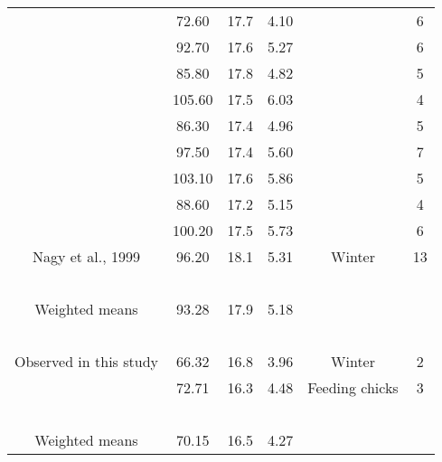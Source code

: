 \documentclass[10pt, twoside]{book} %
\begin{document}
\begin{table}[!ht]
\begin{adjustbox}{max width=\textwidth}
\begin{tabular}{cccccc}
        ~ & 72.60 & 17.7 & 4.10 & ~ & 6 \\ 
        ~ & 92.70 & 17.6 & 5.27 & ~ & 6 \\ 
        ~ & 85.80 & 17.8 & 4.82 & ~ & 5 \\ 
        ~ & 105.60 & 17.5 & 6.03 & ~ & 4 \\ 
        ~ & 86.30 & 17.4 & 4.96 & ~ & 5 \\ 
        ~ & 97.50 & 17.4 & 5.60 & ~ & 7 \\ 
        ~ & 103.10 & 17.6 & 5.86 & ~ & 5 \\ 
        ~ & 88.60 & 17.2 & 5.15 & ~ & 4 \\ 
        ~ & 100.20 & 17.5 & 5.73 & ~ & 6 \\ 
        Nagy et al., 1999 & 96.20 & 18.1 & 5.31 & Winter & 13 \\ 
        ~ & ~ & ~ & ~ & ~ & ~ \\ 
        Weighted means & 93.28 & 17.9 & 5.18 & ~ & ~ \\ 
        ~ & ~ & ~ & ~ & ~ & ~ \\ 
        Observed in this study & 66.32 & 16.8 & 3.96 & Winter & 2 \\ 
        ~ & 72.71 & 16.3 & 4.48 & Feeding chicks & 3 \\ 
        ~ & ~ & ~ & ~ & ~ & ~ \\ 
        Weighted means & 70.15 & 16.5 & 4.27 & ~ & ~ \\ \hline
    \end{tabular}
\end{adjustbox}
\end{table}

\clearpage
\end{document}
